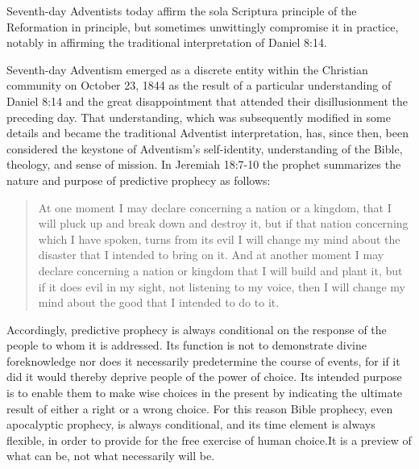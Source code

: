 Seventh-day Adventists today affirm the sola Scriptura principle of the
Reformation in principle, but sometimes unwittingly compromise it in
practice, notably in affirming the traditional interpretation of Daniel
8:14.

Seventh-day Adventism emerged as a discrete entity within the Christian
community on October 23, 1844 as the result of a particular understanding
of Daniel 8:14 and the great disappointment that attended their
disillusionment the preceding day. That understanding, which was
subsequently modified in some details and became the traditional Adventist
interpretation, has, since then, been considered the keystone of Adventism's
self-identity, understanding of the Bible, theology, and sense of mission.
In Jeremiah 18:7-10 the prophet summarizes the nature and purpose of
predictive prophecy as follows: 
\begin{quote}
At one moment I may declare concerning a nation or a
kingdom, that I will pluck up and break down and destroy it, but if that
nation concerning which I have spoken, turns from its evil I will change my
mind about the disaster that I intended to bring on it. And at another
moment I may declare concerning a nation or kingdom that I will build and
plant it, but if it does evil in my sight, not listening to my voice, then I
will change my mind about the good that I intended to do to it. 
\end{quote}

Accordingly, predictive prophecy is always conditional on the response of
the people to whom it is addressed. Its function is not to demonstrate
divine foreknowledge nor does it necessarily predetermine the course of
events, for if it did it would thereby deprive people of the power of
choice. Its intended purpose is to enable them to make wise choices in the
present by indicating the ultimate result of either a right or a wrong
choice. For this reason Bible prophecy, even apocalyptic prophecy, is always
conditional, and its time element is always flexible, in order to provide
for the free exercise of human choice.It is a preview of what can be, not
what necessarily will be.

